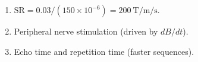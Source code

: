 \begin{enumerate}[leftmargin=1.6em,itemsep=2pt]
\item $\text{SR} = 0.03/(150\times10^{-6}) = 200\ \text{T/m/s}$.
\item Peripheral nerve stimulation (driven by $dB/dt$).
\item Echo time and repetition time (faster sequences).
\end{enumerate}
